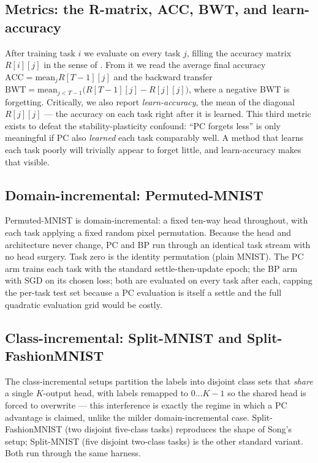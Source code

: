 \subsection{Metrics: the R-matrix, ACC, BWT, and learn-accuracy}

After training task $i$ we evaluate on every task $j$, filling the accuracy matrix $R[i][j]$ in the
sense of \citet{lopezpaz2017gem}. From it we read the average final accuracy
$\mathrm{ACC} = \mathrm{mean}_j R[T-1][j]$ and the backward transfer
$\mathrm{BWT} = \mathrm{mean}_{j<T-1}\big(R[T-1][j] - R[j][j]\big)$, where a negative BWT is forgetting.
Critically, we also report \emph{learn-accuracy}, the mean of the diagonal $R[j][j]$ --- the accuracy on
each task right after it is learned. This third metric exists to defeat the stability-plasticity
confound: ``PC forgets less'' is only meaningful if PC also \emph{learned} each task comparably well. A
method that learns each task poorly will trivially appear to forget little, and learn-accuracy makes
that visible.

\subsection{Domain-incremental: Permuted-MNIST}

Permuted-MNIST is domain-incremental: a fixed ten-way head throughout, with each task applying a fixed
random pixel permutation. Because the head and architecture never change, PC and BP run through an
identical task stream with no head surgery. Task zero is the identity permutation (plain MNIST). The PC
arm trains each task with the standard settle-then-update epoch; the BP arm with SGD on its chosen loss;
both are evaluated on every task after each, capping the per-task test set because a PC evaluation is
itself a settle and the full quadratic evaluation grid would be costly.

\subsection{Class-incremental: Split-MNIST and Split-FashionMNIST}

The class-incremental setups partition the labels into disjoint class sets that \emph{share} a single
$K$-output head, with labels remapped to $0\ldots K-1$ so the shared head is forced to overwrite ---
this interference is exactly the regime in which a PC advantage is claimed, unlike the milder
domain-incremental case. Split-FashionMNIST (two disjoint five-class tasks) reproduces the shape of
Song's setup; Split-MNIST (five disjoint two-class tasks) is the other standard variant. Both
\citep{xiao2017fashionmnist, lecun1998mnist} run through the same harness.

